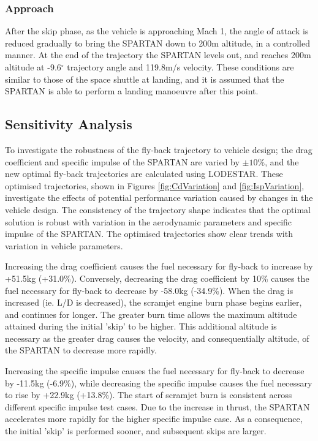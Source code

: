 \subsubsection{ Approach}
After the skip phase, as the vehicle is approaching Mach 1, the angle of attack is reduced gradually to bring the SPARTAN down to 200m altitude, in a controlled manner. 
At the end of the trajectory the SPARTAN levels out, and reaches 200m altitude at -9.6$^\circ$ trajectory angle and 119.8m/s velocity. These conditions are similar to those of the space shuttle at landing\cite{Ryba2017}, and it is assumed that the SPARTAN is able to perform a landing manoeuvre after this point. 








\subsection{Sensitivity Analysis}
To investigate the robustness of the fly-back trajectory to vehicle design; the drag coefficient and specific impulse of the SPARTAN are varied by $\pm 10\%$, and the new optimal fly-back trajectories are calculated using LODESTAR. These optimised trajectories, shown in Figures \ref{fig:CdVariation} and \ref{fig:IspVariation}, investigate the effects of potential performance variation caused by changes in the vehicle design.
The consistency of the trajectory shape indicates that the optimal solution is robust with variation in the aerodynamic parameters and specific impulse of the SPARTAN. The optimised trajectories show clear trends with variation in vehicle parameters.

Increasing the drag coefficient causes the fuel necessary for fly-back to increase by +51.5kg (+31.0\%). Conversely, decreasing the drag coefficient by 10\% causes the fuel necessary for  fly-back to decrease by -58.0kg (-34.9\%). 
When the drag is increased (ie. L/D is decreased), the scramjet engine burn phase begins earlier, and continues for longer. 
The greater burn time allows the maximum altitude attained during the initial 'skip' to be higher. 
This additional altitude is necessary as the greater drag causes the velocity, and consequentially altitude, of the SPARTAN to decrease more rapidly.


Increasing the specific impulse causes the fuel necessary for fly-back to decrease by -11.5kg (-6.9\%), while decreasing the specific impulse causes the fuel necessary to rise by +22.9kg (+13.8\%). The start of scramjet burn is consistent across different specific impulse test cases. Due to the increase in thrust, the SPARTAN accelerates more rapidly for the higher specific impulse case. As a consequence, the initial 'skip' is performed sooner, and subsequent skips are larger. 

